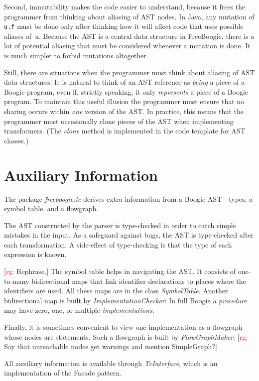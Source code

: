 \documentclass{llncs}
\newcommand{\jmlCode}{\lstinline[style=jml,basicstyle=\normalsize]}
\newcommand{\rg}[1]{{\small [\textcolor{red}{rg}: #1]}}
\begin{document}
Second, immutability makes the code easier to understand, because
it frees the programmer from thinking about aliasing of AST nodes.
In Java, any mutation of \jmlCode|u.f| must be done only after
thinking how it will affect code that uses possible aliases of~$u$.
Because the AST is a central data structure in FreeBoogie, there
is a lot of potential aliasing that must be considered whenever
a mutation is done. It is much simpler to forbid mutations altogether.

Still, there are situations when the programmer must think about aliasing
of AST data structures. It is natural to think of an AST reference as
\emph{being} a piece of a Boogie program, even if, strictly speaking, it
only \emph{represents} a piece of a Boogie program. To maintain this useful
illusion the programmer must ensure that no sharing occurs within
\emph{one} version of the AST\null. In practice, this means that the
programmer must occasionally clone pieces of the AST when implementing
transformers. (The \textit{clone} method is implemented in the code
template for AST classes.)

\section{Auxiliary Information} %

The package \textit{freeboogie.tc} derives extra information from
a Boogie AST---types, a symbol table, and a flowgraph.

The AST constructed by the parser is type-checked in order to
catch simple mistakes in the input. As a safeguard against bugs,
the AST is type-checked after each transformation. A side-effect
of type-checking is that the type of each expression is known.

\rg{Rephrase.}
The symbol table helps in navigating the AST\null. It consists of
one-to-many bidirectional maps that link identifier declarations
to places where the identifiers are used. All
these maps are in the class \textit{SymbolTable}.
Another bidirectional map is built by
\textit{ImplementationChecker}: In full Boogie a \emph{procedure}
may have zero, one, or multiple \emph{implementations}. 

Finally, it is sometimes convenient to view one implementation as a
flowgraph whose nodes are statements. Such a flowgraph is built by
\textit{FlowGraphMaker}. \rg{Say that unreachable nodes get warnings and
mention SimpleGraph?}

All auxiliary information is available through
\textit{TcInterface}, which is an implementation of the Facade
pattern.
\end{document}
